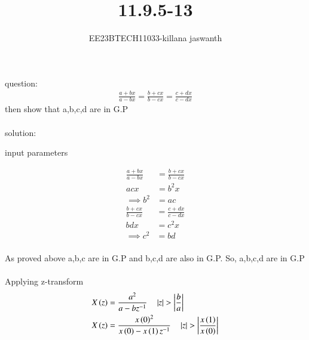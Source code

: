 \documentclass[journal,12pt,twocolumn]{IEEEtran}
\theoremstyle{remark}
\begin{document}

\vspace{3cm}

\title{11.9.5-13}
\author{EE23BTECH11033-killana jaswanth}
\maketitle
\newpage

\bigskip

\renewcommand{\thefigure}{\theenumi}
\renewcommand{\thetable}{\theenumi}
question:\begin{align}
\frac{a+bx}{a-bx}=\frac{b+cx}{b-cx}=\frac{c+dx}{c-dx}
\end{align}
then show that a,b,c,d are in G.P\\\\
solution:
\\\begin{table}[!ht]
 \centering
  
   \caption{input parameters}
   \label{tab:11.9.5.13}
   \end{table}
\begin{align}
\frac{a+bx}{a-bx}&=\frac{b+cx}{b-cx}\\
acx&=b^2x\\
\implies b^2&=ac
\end{align}
\begin{align}
\frac{b+cx}{b-cx}&=\frac{c+dx}{c-dx}\\
bdx&=c^2x\\
\implies c^2&=bd
\end{align}\\
As proved above a,b,c are in G.P and b,c,d are also in G.P. So, a,b,c,d are in G.P\\\\
Applying z-transform\\
\begin{align}
X\left(z\right)&=\frac{a^2}{a-bz^{-1}} \quad \left\vert z\right\vert>\left\vert\frac{b}{a}\right\vert\\
X\left(z\right)&=\frac{x\left({0}\right)^2}{x\left(0\right)-x\left(1\right)z^{-1}}\quad \left\vert z\right\vert>\left\vert\frac{x\left(1\right)}{x\left(0\right)}\right\vert
\end{align}
\end{document}
